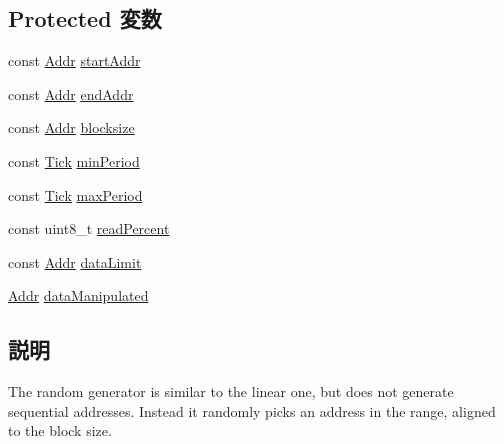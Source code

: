 \subsection*{Protected 変数}
\begin{DoxyCompactItemize}
\item 
const \hyperlink{base_2types_8hh_af1bb03d6a4ee096394a6749f0a169232}{Addr} \hyperlink{classRandomGen_a6aeb968ddd05c079215ef147ed22708a}{startAddr}
\item 
const \hyperlink{base_2types_8hh_af1bb03d6a4ee096394a6749f0a169232}{Addr} \hyperlink{classRandomGen_a1f198116a3da3ee4d73abf4760f70815}{endAddr}
\item 
const \hyperlink{base_2types_8hh_af1bb03d6a4ee096394a6749f0a169232}{Addr} \hyperlink{classRandomGen_aebddb11d20f173e7a5ec2c9f2f591171}{blocksize}
\item 
const \hyperlink{base_2types_8hh_a5c8ed81b7d238c9083e1037ba6d61643}{Tick} \hyperlink{classRandomGen_a4e49eae3c2467df5de83a296f8123619}{minPeriod}
\item 
const \hyperlink{base_2types_8hh_a5c8ed81b7d238c9083e1037ba6d61643}{Tick} \hyperlink{classRandomGen_a1c8c13cc371c24fa5cbb14c737c97f9d}{maxPeriod}
\item 
const uint8\_\-t \hyperlink{classRandomGen_af72793641cb115852317a23ca19dc514}{readPercent}
\item 
const \hyperlink{base_2types_8hh_af1bb03d6a4ee096394a6749f0a169232}{Addr} \hyperlink{classRandomGen_ad6ef2f2a9a6167b2d84c3246a2dd2e92}{dataLimit}
\item 
\hyperlink{base_2types_8hh_af1bb03d6a4ee096394a6749f0a169232}{Addr} \hyperlink{classRandomGen_a708cc056d3a52d0f8f5a2cceffdc6d99}{dataManipulated}
\end{DoxyCompactItemize}


\subsection{説明}
The random generator is similar to the linear one, but does not generate sequential addresses. Instead it randomly picks an address in the range, aligned to the block size. 

